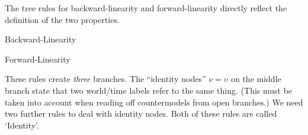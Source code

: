
The tree rules for backward-linearity and forward-linearity directly reflect the
definition of the two properties.
\bigskip
\begin{center}

  \begin{minipage}[t]{0.4\textwidth} \centering
    Backward-Linearity
    
    \tree[2]{
      & \barenode{$\nu < \omega$} & \\
      & \dotbelowbaretribnode{$\upsilon < \omega$} & \\
      && \\
      && \\
      \barenode{$\nu < \upsilon$} & \barenode{$\nu = \upsilon$} & \barenode{$\upsilon < \nu$}
    }
  \end{minipage}
  \begin{minipage}[t]{0.4\textwidth} \centering
    Forward-Linearity

    \tree[2]{
      & \barenode{$\omega < \nu$} & \\
      & \dotbelowbaretribnode{$\omega < \upsilon$} & \\
      && \\
      && \\
      \barenode{$\nu < \upsilon$} & \barenode{$\nu = \upsilon$} & \barenode{$\upsilon < \nu$}
    }
  \end{minipage}
\end{center}
\bigskip%
These rules create \emph{three} branches. The ``identity nodes''
$\nu = \upsilon$ on the middle branch state that two world/time labels refer to
the same thing. (This must be taken into account when reading off countermodels
from open branches.) We need two further rules to deal with identity nodes. Both
of these rules are called `Identity'.%
\bigskip
\begin{center}
  \begin{minipage}[t]{0.3\textwidth} \centering
    
  \end{minipage}
  \begin{minipage}[t]{0.3\textwidth} \centering

  \end{minipage}
\end{center}


